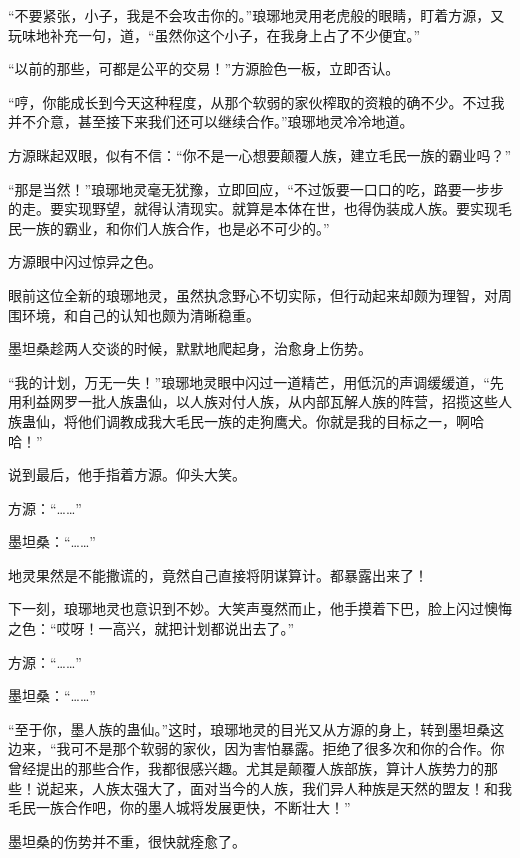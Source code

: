 
\begin{this_body}



“不要紧张，小子，我是不会攻击你的。”琅琊地灵用老虎般的眼睛，盯着方源，又玩味地补充一句，道，“虽然你这个小子，在我身上占了不少便宜。”

“以前的那些，可都是公平的交易！”方源脸色一板，立即否认。

“哼，你能成长到今天这种程度，从那个软弱的家伙榨取的资粮的确不少。不过我并不介意，甚至接下来我们还可以继续合作。”琅琊地灵冷冷地道。

方源眯起双眼，似有不信：“你不是一心想要颠覆人族，建立毛民一族的霸业吗？”

“那是当然！”琅琊地灵毫无犹豫，立即回应，“不过饭要一口口的吃，路要一步步的走。要实现野望，就得认清现实。就算是本体在世，也得伪装成人族。要实现毛民一族的霸业，和你们人族合作，也是必不可少的。”

方源眼中闪过惊异之色。

眼前这位全新的琅琊地灵，虽然执念野心不切实际，但行动起来却颇为理智，对周围环境，和自己的认知也颇为清晰稳重。

墨坦桑趁两人交谈的时候，默默地爬起身，治愈身上伤势。

“我的计划，万无一失！”琅琊地灵眼中闪过一道精芒，用低沉的声调缓缓道，“先用利益网罗一批人族蛊仙，以人族对付人族，从内部瓦解人族的阵营，招揽这些人族蛊仙，将他们调教成我大毛民一族的走狗鹰犬。你就是我的目标之一，啊哈哈！”

说到最后，他手指着方源。仰头大笑。

方源：“……”

墨坦桑：“……”

地灵果然是不能撒谎的，竟然自己直接将阴谋算计。都暴露出来了！

下一刻，琅琊地灵也意识到不妙。大笑声戛然而止，他手摸着下巴，脸上闪过懊悔之色：“哎呀！一高兴，就把计划都说出去了。”

方源：“……”

墨坦桑：“……”

“至于你，墨人族的蛊仙。”这时，琅琊地灵的目光又从方源的身上，转到墨坦桑这边来，“我可不是那个软弱的家伙，因为害怕暴露。拒绝了很多次和你的合作。你曾经提出的那些合作，我都很感兴趣。尤其是颠覆人族部族，算计人族势力的那些！说起来，人族太强大了，面对当今的人族，我们异人种族是天然的盟友！和我毛民一族合作吧，你的墨人城将发展更快，不断壮大！”

墨坦桑的伤势并不重，很快就痊愈了。


\end{this_body}
